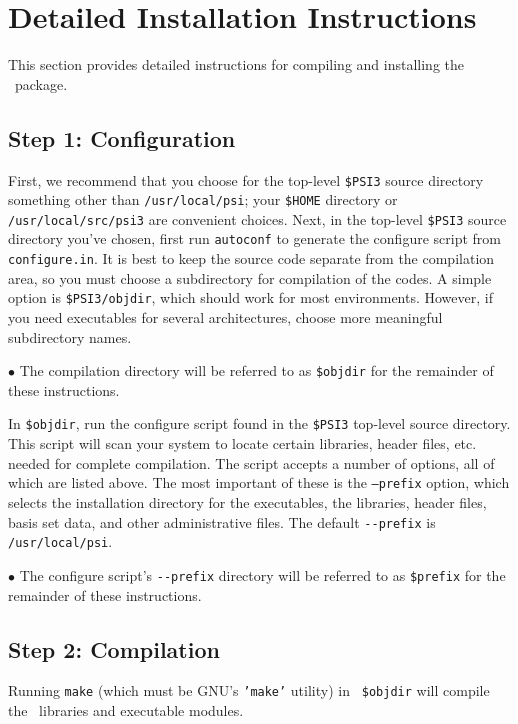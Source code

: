 \documentclass[12pt]{article}
\begin{document}
\section{Detailed Installation Instructions}

This section provides detailed instructions for compiling and
installing the \PSIthree\ package.  

\subsection{Step 1: Configuration}

First, we recommend that you choose for the top-level {\tt \$PSI3} source
directory something other than {\tt /usr/local/psi}; your {\tt \$HOME}
directory or {\tt /usr/local/src/psi3} are convenient choices.  Next,
in the top-level {\tt \$PSI3} source directory you've chosen, first run
{\tt autoconf} to generate the configure script from {\tt configure.in}.
It is best to keep the source code separate from the compilation area,
so you must choose a subdirectory for compilation of the codes.  A simple
option is {\tt \$PSI3/objdir}, which should work for most environments.
However, if you need executables for several architectures, choose more
meaningful subdirectory names.

$\bullet$ The compilation directory will be referred to as {\tt \$objdir}
for the remainder of these instructions.

In {\tt \$objdir}, run the configure script found in the {\tt \$PSI3}
top-level source directory.  This script will scan your system to locate
certain libraries, header files, etc. needed for complete compilation.
The script accepts a number of options, all of which are listed above.
The most important of these is the {\tt --prefix} option, which selects the
installation directory for the executables, the libraries, header files,
basis set data, and other administrative files.  The default {\tt -}{\tt -prefix}
is {\tt /usr/local/psi}.

$\bullet$ The configure script's {\tt -}{\tt -prefix} directory will be referred
to as {\tt \$prefix} for the remainder of these instructions.

\subsection{Step 2: Compilation}

Running {\tt make} (which must be GNU's {\tt 'make'} utility) in {\tt
\$objdir} will compile the \PSIthree\ libraries and executable
modules.
\end{document}
